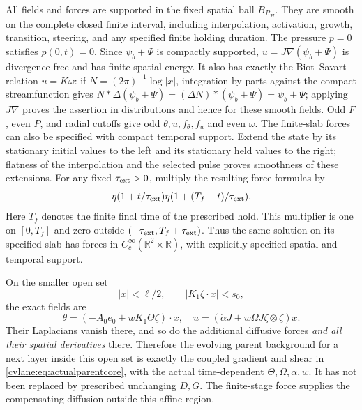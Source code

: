 All fields and forces are supported in the fixed spatial ball
$B_{R_H}$. They are smooth on the complete closed finite interval,
including interpolation, activation, growth, transition, steering,
and any specified finite holding duration. The pressure $p=0$
satisfies $p(0,t)=0$. Since $\psi_b+\Psi$ is compactly supported,
$u=J\nabla(\psi_b+\Psi)$ is divergence free and has finite
spatial energy. It also has exactly the Biot--Savart relation
$u=K\omega$: if $N=(2\pi)^{-1}\log|x|$, integration by parts
against the compact streamfunction gives
$N*\Delta(\psi_b+\Psi)=(\Delta N)*(\psi_b+\Psi)=\psi_b+\Psi$;
applying $J\nabla$ proves the assertion in distributions and hence
for these smooth fields. Odd $F$, even $P$, and radial cutoffs
give odd $\theta,u,f_\theta,f_u$ and even $\omega$.
The finite-slab forces can also be specified with compact temporal
support. Extend the state by its stationary initial values to the
left and its stationary held values to the right; flatness of the
interpolation and the selected pulse proves smoothness of these
extensions. For any fixed $\tau_{\rm ext}>0$, multiply the
resulting force formulas by
\[
 \eta(1+t/\tau_{\rm ext})
 \eta(1+(T_f-t)/\tau_{\rm ext}).
\]
Here $T_f$ denotes the finite final time of the prescribed hold.
This multiplier is one on $[0,T_f]$ and zero outside
$(-\tau_{\rm ext},T_f+\tau_{\rm ext})$. Thus the same solution
on its specified slab has forces in $C_c^\infty(\mathbb R^2\times
\mathbb R)$, with explicitly specified spatial and temporal support.

On the smaller open set
\[
 |x|<\ell/2,\qquad |K_1\zeta\cdot x|<s_0,
\]
the exact fields are
\begin{equation}
 \theta=(-A_0e_0+wK_1\Theta\zeta)\cdot x,
 \quad u=(\dot\alpha J+w\Omega J\zeta\otimes\zeta)x.
 \label{cvlane:eq:actualparentcore}
\end{equation}
Their Laplacians vanish there, and so do the additional diffusive
forces \emph{and all their spatial derivatives} there. Therefore
the evolving parent background for a next layer inside this open
set is exactly the coupled gradient and shear in
\eqref{cvlane:eq:actualparentcore}, with the actual time-dependent
$\Theta,\Omega,\alpha,w$. It has not been replaced by prescribed
unchanging $D,G$. The finite-stage force supplies the compensating
diffusion outside this affine region.

